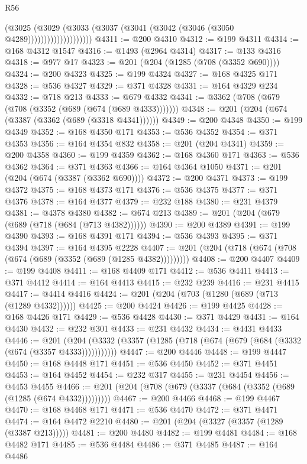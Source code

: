 \begin{lexlean}{R56}
\begin{coremodule}
{{{{{{{{{{{{{{{{{{{{{{{{{{{{{{{{{{{{{{{{{{{{{{{{{{{{{{{{{{{{{{{{{{{{{{{{{{{{{{{{{{{{{{{{{{{{{{{{{{{{{{{{{{{{{{{{{{{{{{{{{{{{{{{{{{{{{{{{{{{{{{{{{{{{{{{{{{{{{{{{{{{{{{{{{{{{{{{{{{{{{{{{{{{{{{{{{{{{{{{{{{{{{{{{{{{                            (@3025
                              (@3029
                                (@3033 (@3037 (@3041 (@3042 (@3046 (@3050 @4289))))))))))))))))))))
@4311 := @200 @4310
@4312 := @199 @4311
@4314 := @168 @4312 @1547
@4316 := @1493 (@2964 @4314)
@4317 := @133 @4316
@4318 := @977 @17
@4323 := @201 (@204 (@1285 (@708 (@3352 @690))))
@4324 := @200 @4323
@4325 := @199 @4324
@4327 := @168 @4325 @171
@4328 := @536 @4327
@4329 := @371 @4328
@4331 := @164 @4329 @234
@4332 := @718 @213
@4333 := @679 @4332
@4341 := @3362 (@708 (@679 (@708 (@3352 (@689 (@674 (@689 @4333)))))))
@4348 := @201 (@204 (@674 (@3387 (@3362 (@689 (@3318 @4341))))))
@4349 := @200 @4348
@4350 := @199 @4349
@4352 := @168 @4350 @171
@4353 := @536 @4352
@4354 := @371 @4353
@4356 := @164 @4354 @832
@4358 := @201 (@204 @4341)
@4359 := @200 @4358
@4360 := @199 @4359
@4362 := @168 @4360 @171
@4363 := @536 @4362
@4364 := @371 @4363
@4366 := @164 @4364 @1050
@4371 := @201 (@204 (@674 (@3387 (@3362 @690))))
@4372 := @200 @4371
@4373 := @199 @4372
@4375 := @168 @4373 @171
@4376 := @536 @4375
@4377 := @371 @4376
@4378 := @164 @4377
@4379 := @232 @188
@4380 := @231 @4379
@4381 := @4378 @4380
@4382 := @674 @213
@4389 := @201 (@204 (@679 (@689 (@718 (@684 (@713 @4382))))))
@4390 := @200 @4389
@4391 := @199 @4390
@4393 := @168 @4391 @171
@4394 := @536 @4393
@4395 := @371 @4394
@4397 := @164 @4395 @2228
@4407 := @201 (@204 (@718 (@674 (@708 (@674 (@689 (@3352 (@689 (@1285 @4382)))))))))
@4408 := @200 @4407
@4409 := @199 @4408
@4411 := @168 @4409 @171
@4412 := @536 @4411
@4413 := @371 @4412
@4414 := @164 @4413
@4415 := @232 @239
@4416 := @231 @4415
@4417 := @4414 @4416
@4424 := @201 (@204 (@703 (@1280 (@689 (@713 (@1289 @4332))))))
@4425 := @200 @4424
@4426 := @199 @4425
@4428 := @168 @4426 @171
@4429 := @536 @4428
@4430 := @371 @4429
@4431 := @164 @4430
@4432 := @232 @301
@4433 := @231 @4432
@4434 := @4431 @4433
@4446 := @201
    (@204 (@3332 (@3357 (@1285 (@718 (@674 (@679 (@684 (@3332 (@674 (@3357 @4333)))))))))))
@4447 := @200 @4446
@4448 := @199 @4447
@4450 := @168 @4448 @171
@4451 := @536 @4450
@4452 := @371 @4451
@4453 := @164 @4452
@4454 := @232 @317
@4455 := @231 @4454
@4456 := @4453 @4455
@4466 := @201 (@204 (@708 (@679 (@3337 (@684 (@3352 (@689 (@1285 (@674 @4332)))))))))
@4467 := @200 @4466
@4468 := @199 @4467
@4470 := @168 @4468 @171
@4471 := @536 @4470
@4472 := @371 @4471
@4474 := @164 @4472 @2210
@4480 := @201 (@204 (@3327 (@3357 (@1289 (@3387 @213)))))
@4481 := @200 @4480
@4482 := @199 @4481
@4484 := @168 @4482 @171
@4485 := @536 @4484
@4486 := @371 @4485
@4487 := @164 @4486
}}}}}}}}}}}}}}}}}}}}}}}}}}}}}}}}}}}}}}}}}}}}}}}}}}}}}}}}}}}}}}}}}}}}}}}}}}}}}}}}}}}}}}}}}}}}}}}}}}}}}}}}}}}}}}}}}}}}}}}}}}}}}}}}}}}}}}}}}}}}}}}}}}}}}}}}}}}}}}}}}}}}}}}}}}}}}}}}}}}}}}}}}}}}}}}}}}}}}}}}}}}}}}}}}}}
\end{coremodule}
\end{lexlean}
